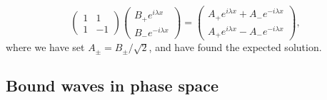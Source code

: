 \begin{example}
\begin{equation}
\begin{pmatrix}
    1 & 1\\
    1 & -1
  \end{pmatrix}
  \begin{pmatrix}
    B_{+}e^{i\lambda x}\\
    B_{-}e^{-i\lambda x}
  \end{pmatrix}
  =
  \begin{pmatrix}
    A_{+}e^{i\lambda x} + A_{-}e^{-i\lambda x}\\
    A_{+}e^{i\lambda x} - A_{-}e^{-i\lambda x}
  \end{pmatrix},
\end{equation}
%
where we have set $A_{\pm} = B_{\pm}/\sqrt{2}$, and have found the expected solution.
\end{example}

\subsection{Bound waves in phase space}

